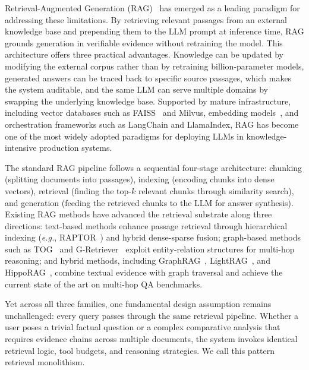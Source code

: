 \documentclass[11pt,a4paper]{article}
\newcommand{\eg}{\textit{e.g.}}
\begin{document}
Retrieval-Augmented Generation (RAG)~\citep{lewis2020rag} has emerged as a leading paradigm for addressing these limitations.
By retrieving relevant passages from an external knowledge base and prepending them to the LLM prompt at inference time, RAG grounds generation in verifiable evidence without retraining the model.
This architecture offers three practical advantages. Knowledge can be updated by modifying the external corpus rather than by retraining billion-parameter models, generated answers can be traced back to specific source passages, which makes the system auditable, and the same LLM can serve multiple domains by swapping the underlying knowledge base.
Supported by mature infrastructure, including vector databases such as FAISS~\citep{johnson2019faiss} and Milvus, embedding models~\citep{chen2024m3embedding}, and orchestration frameworks such as LangChain and LlamaIndex, RAG has become one of the most widely adopted paradigms for deploying LLMs in knowledge-intensive production systems.


The standard RAG pipeline follows a sequential four-stage architecture: chunking (splitting documents into passages), indexing (encoding chunks into dense vectors), retrieval (finding the top-$k$ relevant chunks through similarity search), and generation (feeding the retrieved chunks to the LLM for answer synthesis).
Existing RAG methods have advanced the retrieval substrate along three directions:
text-based methods enhance passage retrieval through hierarchical indexing (\eg, RAPTOR~\citep{sarthi2024raptor}) and hybrid dense-sparse fusion;
graph-based methods such as TOG~\citep{sun2024tog} and G-Retriever~\citep{he2024gretriever} exploit entity-relation structures for multi-hop reasoning;
and hybrid methods, including GraphRAG~\citep{edge2024graphrag}, LightRAG~\citep{guo2024lightrag}, and HippoRAG~\citep{gutierrez2024hipporag}, combine textual evidence with graph traversal and achieve the current state of the art on multi-hop QA benchmarks.


Yet across all three families, one fundamental design assumption remains unchallenged: every query passes through the same retrieval pipeline.
Whether a user poses a trivial factual question or a complex comparative analysis that requires evidence chains across multiple documents, the system invokes identical retrieval logic, tool budgets, and reasoning strategies.
We call this pattern retrieval monolithism.
\end{document}

